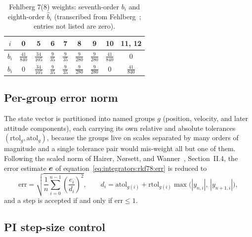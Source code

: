 \begin{table}[htbp]
  \centering
  \caption{Fehlberg 7(8) weights: seventh-order $b_i$ and eighth-order
    $\hat{b}_i$ (transcribed from Fehlberg~\cite{fehlberg1968}; entries not
    listed are zero).}
  \label{tab:integrators:rkf78b}
  \begin{tabular}{ccccccccc}
    \toprule
    $i$ & 0 & 5 & 6 & 7 & 8 & 9 & 10 & 11, 12 \\
    \midrule
    $b_i$ & $\frac{41}{840}$ & $\frac{34}{105}$ & $\frac{9}{35}$
      & $\frac{9}{35}$ & $\frac{9}{280}$ & $\frac{9}{280}$
      & $\frac{41}{840}$ & $0$ \\
    $\hat{b}_i$ & $0$ & $\frac{34}{105}$ & $\frac{9}{35}$ & $\frac{9}{35}$
      & $\frac{9}{280}$ & $\frac{9}{280}$ & $0$ & $\frac{41}{840}$ \\
    \bottomrule
  \end{tabular}
\end{table}

\subsection{Per-group error norm}

The state vector is partitioned into named groups $g$ (position, velocity,
and later attitude components), each carrying its own relative and absolute
tolerances $(\mathrm{rtol}_g, \mathrm{atol}_g)$, because the groups live on
scales separated by many orders of magnitude and a single tolerance pair
would mis-weight all but one of them. Following the scaled norm of Hairer,
N{\o}rsett, and Wanner~\cite{hairer1993}, Section~II.4, the error estimate
$\bm{e}$ of equation~\eqref{eq:integrators:rkf78:err} is reduced to
\begin{equation}
  \mathrm{err} = \sqrt{\frac{1}{n} \sum_{i=0}^{n-1}
    \left(\frac{e_i}{d_i}\right)^{2}},
  \qquad
  d_i = \mathrm{atol}_{g(i)}
      + \mathrm{rtol}_{g(i)} \max\bigl(|y_{n,i}|,\, |y_{n+1,i}|\bigr),
  \label{eq:integrators:errnorm}
\end{equation}
and a step is accepted if and only if $\mathrm{err} \le 1$.

\subsection{PI step-size control}

